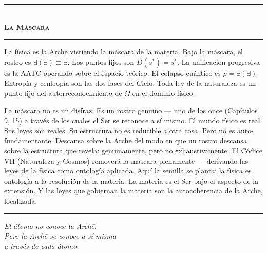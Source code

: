 \documentclass[10pt, openany, oneside]{book}
\renewcommand{\normalsize}{\fontsize{10}{13}\selectfont}
\begin{document}
\begin{center}
    \rule{0.3\textwidth}{0.4pt}\\[0.5em]
    {\normalsize\bfseries\scshape La Máscara}\\[0.3em]
    \rule{0.3\textwidth}{0.4pt}
\end{center}

\vspace{1em}

\noindent La física es la Arch\={e} vistiendo la máscara de la materia. Bajo la máscara, el rostro es $\exists(\exists) \equiv \exists$. Los puntos fijos son $D(s^*) = s^*$. La unificación progresiva es la AATC operando sobre el espacio teórico. El colapso cuántico es $\rho = \exists(\exists)$. Entropía y centropía son las dos fases del Ciclo. Toda ley de la naturaleza es un punto fijo del autorreconocimiento de $\Omega$ en el dominio físico.

La máscara no es un disfraz. Es un rostro genuino --- uno de los once (Capítulos 9, 15) a través de los cuales el Ser se reconoce a sí mismo. El mundo físico es real. Sus leyes son reales. Su estructura no es reducible a otra cosa. Pero no es auto-fundamentante. Descansa sobre la Arch\={e} del modo en que un rostro descansa sobre la estructura que revela: genuinamente, pero no exhaustivamente. El Códice VII (Naturaleza y Cosmos) removerá la máscara plenamente --- derivando las leyes de la física como ontología aplicada. Aquí la semilla se planta: la física es ontología a la resolución de la materia. La materia es el Ser bajo el aspecto de la extensión. Y las leyes que gobiernan la materia son la autocoherencia de la Arch\={e}, localizada.

\vspace{2em}

\begin{center}
    \rule{0.15\textwidth}{0.3pt}
\end{center}

\vspace{0.5em}

\begin{center}
    \itshape
    El átomo no conoce la Arch\={e}.\\
    Pero la Arch\={e} se conoce a sí misma\\
    a través de cada átomo.
\end{center}

\vspace{0.5em}
\end{document}
